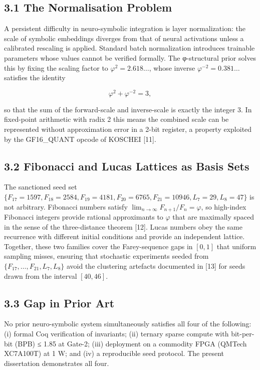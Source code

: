 \subsection{3.1 The Normalisation
Problem}\label{fa_02:the-normalisation-problem}

A persistent difficulty in neuro-symbolic
integration is layer normalization: the scale of
symbolic embeddings diverges from that of neural
activations unless a calibrated rescaling is
applied. Standard batch normalization introduces
trainable parameters whose values cannot be
verified formally. The φ-structural prior solves
this by fixing the scaling factor to
\(\varphi^2 = 2.618\ldots\), whose inverse
\(\varphi^{-2} = 0.381\ldots\) satisfies the
identity

\[\varphi^2 + \varphi^{-2} = 3,\]

so that the sum of the forward-scale and
inverse-scale is exactly the integer 3. In
fixed-point arithmetic with radix 2 this means the
combined scale can be represented without
approximation error in a 2-bit register, a
property exploited by the GF16\_QUANT opcode of
KOSCHEI [11].

\subsection{3.2 Fibonacci and Lucas Lattices as
Basis
Sets}\label{fa_02:fibonacci-and-lucas-lattices-as-basis-sets}

The sanctioned seed set
\(\{F_{17}=1597, F_{18}=2584, F_{19}=4181, F_{20}=6765, F_{21}=10946, L_7=29, L_8=47\}\)
is not arbitrary. Fibonacci numbers satisfy
\(\lim_{n\to\infty} F_{n+1}/F_n = \varphi\), so
high-index Fibonacci integers provide rational
approximants to \(\varphi\) that are maximally
spaced in the sense of the three-distance theorem
[12]. Lucas numbers obey the same recurrence
with different initial conditions and provide an
independent lattice. Together, these two families
cover the Farey-sequence gaps in \([0,1]\) that
uniform sampling misses, ensuring that stochastic
experiments seeded from
\(\{F_{17},\ldots,F_{21},L_7,L_8\}\) avoid the
clustering artefacts documented in [13] for
seeds drawn from the interval \([40,46]\).

\subsection{3.3 Gap in Prior
Art}\label{fa_02:gap-in-prior-art}

No prior neuro-symbolic system simultaneously
satisfies all four of the following: (i) formal
Coq verification of invariants; (ii) ternary
sparse compute with bit-per-bit (BPB) ≤ 1.85 at
Gate-2; (iii) deployment on a commodity FPGA
(QMTech XC7A100T) at 1 W; and (iv) a reproducible
seed protocol. The present dissertation
demonstrates all four.

